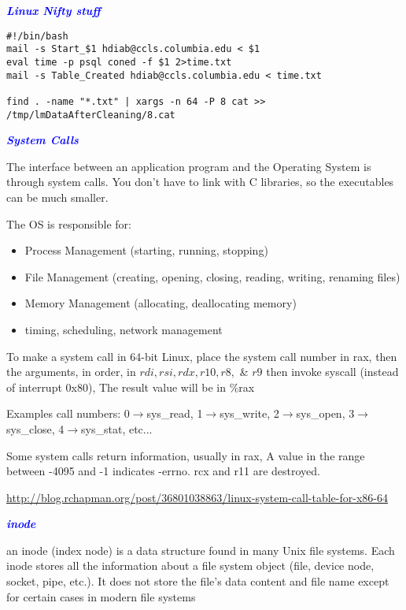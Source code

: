 \documentclass[9pt]{amsart}
\newcommand{\filldots}{\noindent \textbf {\textcolor {blue} {\dotfill}} }
\begin{document}
\begin{multicols}{2}    %

\noindent \textbf {\textcolor {blue} {\em Linux Nifty stuff}}

\begin{lstlisting}
#!/bin/bash
mail -s Start_$1 hdiab@ccls.columbia.edu < $1
eval time -p psql coned -f $1 2>time.txt
mail -s Table_Created hdiab@ccls.columbia.edu < time.txt

find . -name "*.txt" | xargs -n 64 -P 8 cat >> /tmp/lmDataAfterCleaning/8.cat
\end{lstlisting}

\noindent \textbf {\textcolor {blue} {\em System Calls}} 

The interface between an application program and the Operating System is through system calls. You don't have to link with C libraries, so the executables can be much smaller.

The OS is responsible for:
\begin{itemize}
\item Process Management (starting, running, stopping)
\item File Management (creating, opening, closing, reading, writing, renaming files)
\item Memory Management (allocating, deallocating memory)
\item timing, scheduling, network management 
\end{itemize}

\noindent To make a system call in 64-bit Linux, place the system call number in rax, then the arguments, in order, in $rdi, rsi, rdx, r10, r8,$ \& $r9$ then invoke syscall (instead of interrupt 0x80), The result value will be in \%rax

\noindent Examples call numbers: 0$\to$sys\_read, 1$\to$sys\_write, 2$\to$sys\_open, 3$\to$sys\_close, 4$\to$sys\_stat, etc...

\noindent Some system calls return information, usually in rax, A value in the range between -4095 and -1 indicates -errno. rcx and r11 are destroyed. 

\noindent \url{http://blog.rchapman.org/post/36801038863/linux-system-call-table-for-x86-64}

\filldots
 
\noindent \textbf {\textcolor {blue} {\em inode}} 

\noindent an inode (index node) is a data structure found in many Unix file systems. Each inode stores all the information about a file system object (file, device node, socket, pipe, etc.). It does not store the file's data content and file name except for certain cases in modern file systems


\end{multicols}
\end{document}
